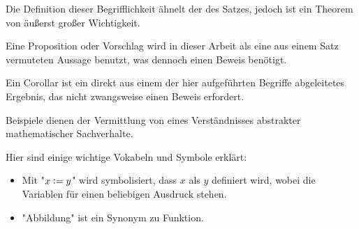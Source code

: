 \theoremstyle{theo}
\begin{theo}
Die Definition dieser Begrifflichkeit ähnelt der des Satzes, jedoch ist ein Theorem von äußerst großer Wichtigkeit.
\end{theo}

\theoremstyle{prop}
\begin{prop}{}
Eine Proposition oder Vorschlag wird in dieser Arbeit als eine aus einem Satz vermuteten Aussage benutzt, was dennoch einen Beweis benötigt.
\end{prop}

\theoremstyle{Corollar}
\begin{Corollar}
Ein Corollar ist ein direkt aus einem der hier aufgeführten Begriffe abgeleitetes Ergebnis, das nicht zwangsweise einen Beweis erfordert.
\end{Corollar}

\theoremstyle{example}
\begin{example}
Beispiele dienen der Vermittlung von eines Verständnisses abstrakter mathematischer Sachverhalte.
\end{example}

Hier sind einige wichtige Vokabeln und Symbole erklärt:
\begin{itemize}
\item Mit "$x\vcentcolon=y$" wird symbolisiert, dass $x$ als $y$ definiert wird, wobei die Variablen für einen beliebigen Ausdruck stehen.
\item "Abbildung" ist ein Synonym zu Funktion.
\end{itemize}







